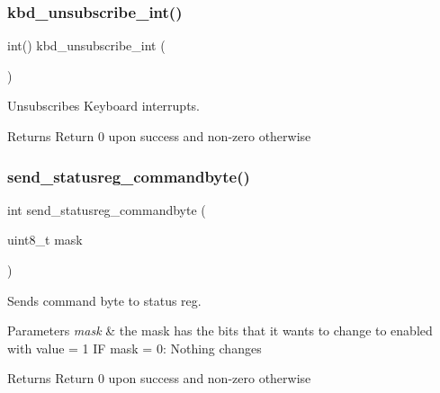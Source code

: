 \subsubsection{\texorpdfstring{kbd\+\_\+unsubscribe\+\_\+int()}{kbd\_unsubscribe\_int()}}
{\footnotesize\ttfamily int() kbd\+\_\+unsubscribe\+\_\+int (\begin{DoxyParamCaption}{ }\end{DoxyParamCaption})}



Unsubscribes Keyboard interrupts. 

\begin{DoxyReturn}{Returns}
Return 0 upon success and non-\/zero otherwise 
\end{DoxyReturn}
\mbox{\label{group__Keyboard_gade2f6cbc5a539bc152aca944b3cd5c43}} 
\subsubsection{\texorpdfstring{send\+\_\+statusreg\+\_\+commandbyte()}{send\_statusreg\_commandbyte()}}
{\footnotesize\ttfamily int send\+\_\+statusreg\+\_\+commandbyte (\begin{DoxyParamCaption}\item[{uint8\+\_\+t}]{mask }\end{DoxyParamCaption})}



Sends command byte to status reg. 


\begin{DoxyParams}{Parameters}
{\em mask} & the mask has the bits that it wants to change to enabled with value = 1 IF mask = 0\+: Nothing changes\\
\hline
\end{DoxyParams}
\begin{DoxyReturn}{Returns}
Return 0 upon success and non-\/zero otherwise 
\end{DoxyReturn}

